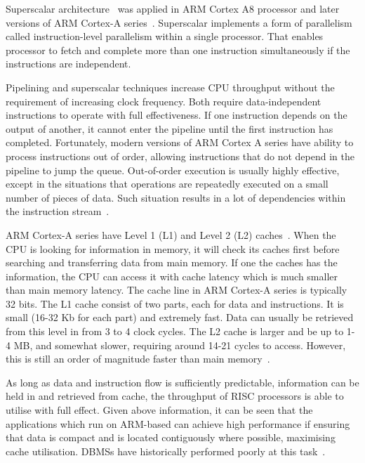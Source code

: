 Superscalar architecture~\citep{Smith:1995} was applied in ARM Cortex A8 processor and later versions of ARM Cortex-A series~\citep{Wang:2011}.
Superscalar implements a form of parallelism called instruction-level parallelism within a single processor.
That enables processor to fetch and complete more than one instruction simultaneously if the instructions are independent.

Pipelining and superscalar techniques increase CPU throughput without the requirement of increasing clock frequency.
Both require data-independent instructions to operate with full effectiveness.
If one instruction depends on the output of another, it cannot enter the pipeline until the first instruction has completed.
Fortunately, modern versions of ARM Cortex A series have ability to process instructions out of order, allowing instructions that do not depend in the pipeline to jump the queue.
Out-of-order execution is usually highly effective, except in the situations that operations are repeatedly executed on a small number of pieces of data.
Such situation results in a lot of dependencies within the instruction stream~\citep{Zukowski:2006}.

ARM Cortex-A series have Level 1 (L1) and Level 2 (L2) caches~\citep{Wang:2011}. 
When the CPU is looking for information in memory, it will check its caches first before searching and transferring data from main memory.
If one the caches has the information, the CPU can access it with cache latency which is much smaller than main memory latency.
The cache line in ARM Cortex-A series is typically 32 bits.
The L1 cache consist of two parts, each for data and instructions. It is small (16-32 Kb for each part) and extremely fast. 
Data can usually be retrieved from this level in from 3 to 4 clock cycles. 
The L2 cache is larger and be up to 1-4 MB, and somewhat slower, requiring around 14-21 cycles to access. 
However, this is still an order of magnitude faster than main memory~\citep{Drepper:2007}.

As long as data and instruction flow is sufficiently predictable, information can be held in and retrieved from cache, the throughput of RISC processors is able to utilise with full effect. 
Given above information, it can be seen that the applications which run on ARM-based can achieve high performance if ensuring that data is compact and is located contiguously where possible, maximising cache utilisation.
DBMSs have historically performed poorly at this task~\citep{Ailamaki:1999}.

